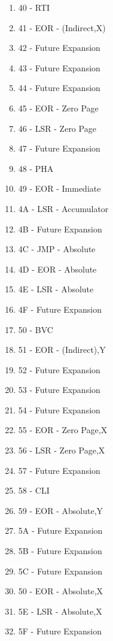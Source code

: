 \documentclass{article}
\begin{document}
\begin{multicols}{2}
\begin{enumerate}[label=\enumHex*,start=0]
    \item 40 - RTI                        
    \item 41 - EOR - (Indirect,X)         
    \item 42 - Future Expansion           
    \item 43 - Future Expansion           
    \item 44 - Future Expansion           
    \item 45 - EOR - Zero Page            
    \item 46 - LSR - Zero Page            
    \item 47 - Future Expansion           
    \item 48 - PHA                        
    \item 49 - EOR - Immediate            
    \item 4A - LSR - Accumulator          
    \item 4B - Future Expansion           
    \item 4C - JMP - Absolute             
    \item 4D - EOR - Absolute             
    \item 4E - LSR - Absolute             
    \item 4F - Future Expansion           
    \item 50 - BVC                        
    \item 51 - EOR - (Indirect),Y         
    \item 52 - Future Expansion           
    \item 53 - Future Expansion           
    \item 54 - Future Expansion           
    \item 55 - EOR - Zero Page,X          
    \item 56 - LSR - Zero Page,X          
    \item 57 - Future Expansion           
    \item 58 - CLI                        
    \item 59 - EOR - Absolute,Y           
    \item 5A - Future Expansion           
    \item 5B - Future Expansion           
    \item 5C - Future Expansion           
    \item 50 - EOR - Absolute,X           
    \item 5E - LSR - Absolute,X           
    \item 5F - Future Expansion           

\end{enumerate}
\end{multicols}
\end{document}
